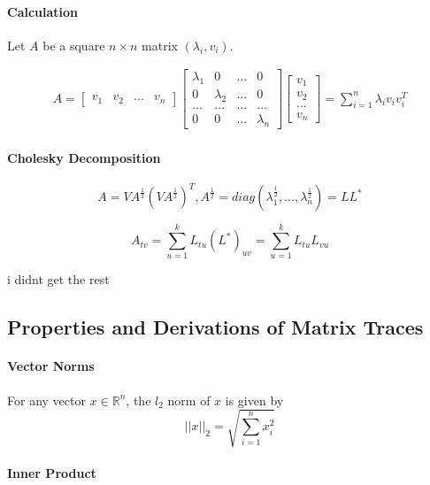 \documentclass{article}
\theoremstyle{definition}
\theoremstyle{remark}
\begin{document}
\paragraph{Calculation}

Let $A$ be a square $n \times n$ matrix $(\lambda_i, v_i)$.

\begin{align*}
    A = \begin{bmatrix}
        v_1 & v_2 & ... & v_n
    \end{bmatrix} \begin{bmatrix}
        \lambda_1 & 0 & ... & 0 \\
        0 & \lambda_2 & ... & 0 \\
        ... & ... & ... & ... \\
        0 & 0 & ... & \lambda_n
    \end{bmatrix} \begin{bmatrix}
        v_1 \\ v_2 \\ ... \\ v_n \end{bmatrix} = \sum_{i=1}^{n} \lambda_i v_i v_i^T
\end{align*}

\paragraph{Cholesky Decomposition} 

$$A = VA^{\frac{1}{2}}(VA^{\frac{1}{2}})^T, A^{\frac{1}{2}} = diag(\lambda_1^{\frac{1}{2}},...,\lambda_n^{\frac{1}{2}}) = LL^*$$

$$A_{tv} = \sum_{u=1}^k L_{tu}(L^*)_{uv} = \sum_{u=1}^k L_{tu}L_{vu}$$

i didnt get the rest



\subsection{Properties and Derivations of Matrix Traces}

\paragraph{Vector Norms}

For any vector $x \in \mathbb{R}^n$, the $l_2$ norm of $x$ is given by $$||x||_2 = \sqrt{\sum_{i=1}^n x_i^2}$$

\paragraph{Inner Product}
\end{document}
